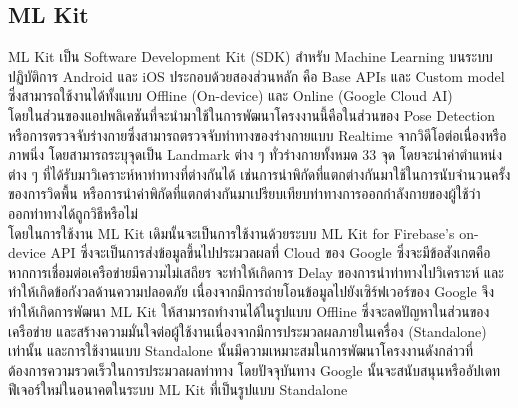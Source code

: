 \subsection{ML Kit}
ML Kit เป็น Software Development Kit (SDK) สำหรับ Machine Learning บนระบบปฏิบัติการ Android และ iOS ประกอบด้วยสองส่วนหลัก คือ Base APIs และ Custom model ซึ่งสามารถใช้งานได้ทั้งแบบ Offline (On-device) และ Online (Google Cloud AI)
\\\indent
โดยในส่วนของแอปพลิเคชันที่จะนำมาใช้ในการพัฒนาโครงงานนี้คือในส่วนของ Pose Detection หรือการตรวจจับร่างกายซึ่งสามารถตรวจจับท่าทางของร่างกายแบบ Realtime จากวิดีโอต่อเนื่องหรือภาพนิ่ง โดยสามารถระบุจุดเป็น Landmark ต่าง ๆ ทั่วร่างกายทั้งหมด 33 จุด โดยจะนำค่าตำแหน่งต่าง ๆ ที่ได้รับมาวิเคราะห์หาท่าทางที่ต่างกันได้ เช่นการนำพิกัดที่แตกต่างกันมาใช้ในการนับจำนวนครั้งของการวิดพื้น หรือการนำค่าพิกัดที่แตกต่างกันมาเปรียบเทียบท่าทางการออกกำลังกายของผู้ใช้ว่าออกท่าทางได้ถูกวิธีหรือไม่
\\\indent
โดยในการใช้งาน ML Kit เดิมนั้นจะเป็นการใช้งานด้วยระบบ ML Kit for Firebase’s on-device API ซึ่งจะเป็นการส่งข้อมูลขึ้นไปประมวลผลที่ Cloud ของ Google ซึ่งจะมีข้อสังเกตคือ หากการเชื่อมต่อเครือข่ายมีความไม่เสถียร จะทำให้เกิดการ Delay ของการนำท่าทางไปวิเคราะห์ และทำให้เกิดข้อกังวลด้านความปลอดภัย เนื่องจากมีการถ่ายโอนข้อมูลไปยังเซิร์ฟเวอร์ของ Google จึงทำให้เกิดการพัฒนา ML Kit ให้สามารถทำงานได้ในรูปแบบ Offline ซึ่งจะลดปัญหาในส่วนของเครือข่าย และสร้างความมั่นใจต่อผู้ใช้งานเนื่องจากมีการประมวลผลภายในเครื่อง (Standalone) เท่านั้น และการใช้งานแบบ Standalone นั้นมีความเหมาะสมในการพัฒนาโครงงานดังกล่าวที่ต้องการความรวดเร็วในการประมวลผลท่าทาง โดยปัจจุบันทาง Google นั้นจะสนับสนุนหรืออัปเดทฟีเจอร์ใหม่ในอนาคตในระบบ ML Kit ที่เป็นรูปแบบ Standalone

